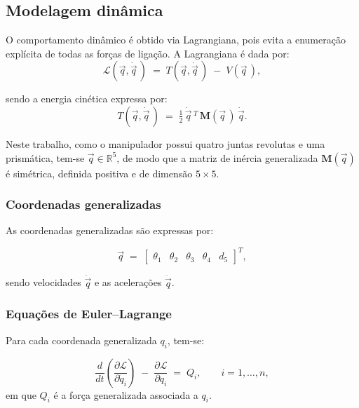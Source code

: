 \subsection{Modelagem dinâmica}
\label{sec:MR_modelagem_dinamica}

O comportamento dinâmico é obtido via Lagrangiana, pois evita a enumeração explícita de todas as forças de ligação.
A Lagrangiana é dada por:
\begin{equation}
\mathcal{L}(\vec q,\dot{\vec q}\,) \;=\; T(\vec q,\dot{\vec q}\,) \;-\; V(\vec q\,),
\end{equation}

sendo a energia cinética expressa por:
\begin{equation}
\label{eq:energia_cinetica_lagrangiana}
T(\vec q,\dot{\vec q}\,)
\;=\;
\tfrac12\,\dot{\vec q}\,^T\,\mathbf M(\vec q\,)\,\dot{\vec q}.
\end{equation}

Neste trabalho, como o manipulador possui quatro juntas revolutas e uma prismática, tem-se 
$\vec q \in \mathbb{R}^{5}$, de modo que a matriz de inércia generalizada 
$\mathbf M(\vec q)$ é simétrica, definida positiva e de dimensão $5\times 5$.

\subsubsection{Coordenadas generalizadas}
As coordenadas generalizadas são expressas por:

\begin{equation}
\vec q
\;=\;
\begin{bmatrix}\theta_1 & \theta_2 & \theta_3 & \theta_4 & d_5\end{bmatrix}^T,
\end{equation}

sendo velocidades $\dot{\vec q}$ e
as acelerações $\ddot{\vec q}$.

\subsubsection{Equações de Euler--Lagrange}
Para cada coordenada generalizada $q_i$, tem-se:

\begin{equation}
\frac{d}{dt}\!\left(\frac{\partial \mathcal L}{\partial \dot q_i}\right)
\;-\; \frac{\partial \mathcal L}{\partial q_i}
\;=\;
Q_i, \qquad i=1,\dots,n,
\label{eq:EL_componentes}
\end{equation}
em que $Q_i$ é a força generalizada associada a $q_i$.

